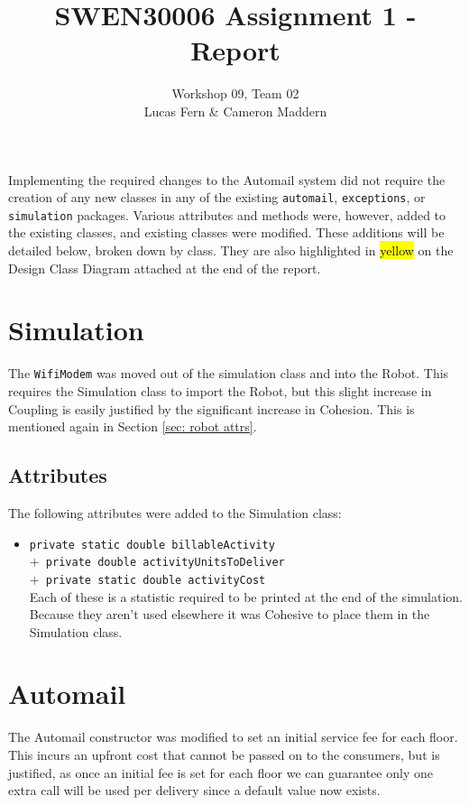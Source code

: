 \documentclass{article}
\title{\vspace{-1.5cm}SWEN30006 Assignment 1 - Report}
\date{}
\author{Workshop 09, Team 02\\Lucas Fern \& Cameron Maddern}
\begin{document}
\maketitle
\noindent Implementing the required changes to the Automail system did not require the creation of any new classes in any of the existing \verb|automail|, \verb|exceptions|, or \verb|simulation| packages. Various attributes and methods were, however, added to the existing classes, and existing classes were modified. These additions will be detailed below, broken down by class. They are also highlighted in \hl{yellow} on the Design Class Diagram attached at the end of the report.

\section{Simulation}
The \verb|WifiModem| was moved out of the simulation class and into the Robot. This requires the Simulation class to import the Robot, but this slight increase in Coupling is easily justified by the significant increase in Cohesion. This is mentioned again in Section \ref{sec: robot attrs}. 
\subsection{Attributes}
The following attributes were added to the Simulation class:
\begin{itemize}
    \item \verb|private static double billableActivity|\\
         +\verb| private double activityUnitsToDeliver|\\
         +\verb| private static double activityCost|\\[2mm]
    Each of these is a statistic required to be printed at the end of the simulation. Because they aren't used elsewhere it was Cohesive to place them in the Simulation class.
\end{itemize}

\section{Automail}
The Automail constructor was modified to set an initial service fee for each floor. This incurs an upfront cost that cannot be passed on to the consumers, but is justified, as once an initial fee is set for each floor we can guarantee only one extra call will be used per delivery since a default value now exists.
\end{document}
